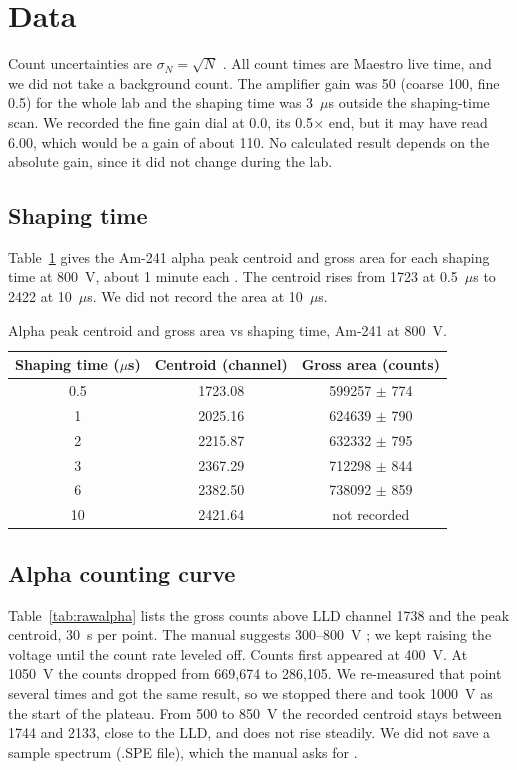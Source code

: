 \documentclass[12pt]{article}
\begin{document}


\section{Data}
\label{sec:data}

Count uncertainties are $\sigma_N = \sqrt{N}$ \cite{knoll}. All count times are Maestro live time, and we did not take a background count. The amplifier gain was 50 (coarse 100, fine 0.5) for the whole lab and the shaping time was 3~$\mu$s outside the shaping-time scan. We recorded the fine gain dial at 0.0, its 0.5$\times$ end, but it may have read 6.00, which would be a gain of about 110. No calculated result depends on the absolute gain, since it did not change during the lab.

\subsection{Shaping time}

Table~\ref{tab:rawshape} gives the Am-241 alpha peak centroid and gross area for each shaping time at 800~V, about 1 minute each \cite{labmanual}. The centroid rises from 1723 at 0.5~$\mu$s to 2422 at 10~$\mu$s. We did not record the area at 10~$\mu$s.

\begin{table}[!htbp]
\centering\small
\begin{tabular}{ccc}
\toprule
\textbf{Shaping time ($\mu$s)} & \textbf{Centroid (channel)} & \textbf{Gross area (counts)} \\
\midrule
0.5 & 1723.08 & 599257 $\pm$ 774 \\
1 & 2025.16 & 624639 $\pm$ 790 \\
2 & 2215.87 & 632332 $\pm$ 795 \\
3 & 2367.29 & 712298 $\pm$ 844 \\
6 & 2382.50 & 738092 $\pm$ 859 \\
10 & 2421.64 & not recorded \\
\bottomrule
\end{tabular}
\caption{Alpha peak centroid and gross area vs shaping time, Am-241 at 800~V.}
\label{tab:rawshape}
\end{table}

\subsection{Alpha counting curve}

Table~\ref{tab:rawalpha} lists the gross counts above LLD channel 1738 and the peak centroid, 30~s per point. The manual suggests 300--800~V \cite{labmanual}; we kept raising the voltage until the count rate leveled off. Counts first appeared at 400~V. At 1050~V the counts dropped from 669,674 to 286,105. We re-measured that point several times and got the same result, so we stopped there and took 1000~V as the start of the plateau. From 500 to 850~V the recorded centroid stays between 1744 and 2133, close to the LLD, and does not rise steadily. We did not save a sample spectrum (.SPE file), which the manual asks for \cite{labmanual}.
\end{document}
